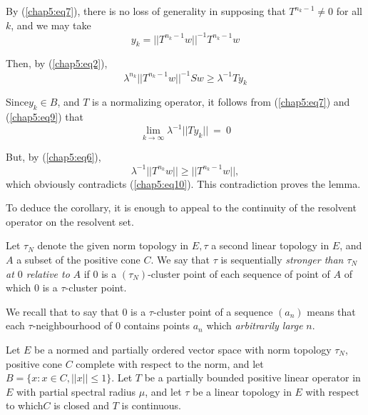 By (\ref{chap5:eq7}), there is no loss of generality in supposing that
$T^{n_k - 1} 
\neq 0$ for all $k$, and we may take 
\begin{equation}
  y_k = || T^{n_k - 1} w || ^{-1} T^{n_k - 1} w \tag{8}\label{chap5:eq8}
\end{equation} 
 
 Then, by (\ref{chap5:eq2}),
 \begin{equation}
   \lambda^{n_k} || T^{n_k - 1} w ||^{-1} S w \geq \lambda^{-1} Ty_k
   \tag{9}\label{chap5:eq9} 
 \end{equation} 
 
 Since\pageoriginale $y_k \in B$, and $T$ is a normalizing operator,
 it follows from (\ref{chap5:eq7}) and (\ref{chap5:eq9}) that  
 \begin{equation}
   \lim_{k \to \infty} \lambda^{-1} ||Ty_k || ~ = ~ 0
   \tag{10}\label{chap5:eq10} 
 \end{equation} 
 
 But, by (\ref{chap5:eq6}), 
 $$
 \lambda^{-1} || T^{n_k} w || \geq || T^{n_k -1} w || ,
 $$
 which obviously contradicts (\ref{chap5:eq10}). This contradiction
 proves the lemma. 
 
 To deduce the corollary, it is enough to appeal to the continuity of
 the resolvent operator on the resolvent set. 
 
\begin{Definition}%
  Let $\tau_N$ denote the given norm topology in $E, \tau$ a second
  linear topology in $E$, and $A$ a subset of the positive cone
  $C$. We say that $\tau$ is sequentially {\em stronger than $\tau_N$
    at $0$ relative to} $A$ if $0$ is a $(\tau_N)$-cluster point of
  each sequence of point of $A$ of which $0$ is a $\tau$-cluster
  point. 
\end{Definition} 
 
We recall that to say that $0$ is a $\tau$-cluster point of a sequence
$(a_n)$ means that each $\tau$-neighbourhood of $0$ contains points
$a_n$ which \textit{arbitrarily large} $n$. 
 
\begin{thmm}\label{chap5:thm5.1} %
  Let $E$ be a normed and partially ordered vector space with norm
  topology $\tau_N$, positive cone $C$ complete with respect to the
  norm, and let $B = \{ x : x \in C, || x || \leq 1 \}$. Let $T$ be a
  partially bounded positive linear operator in $E$ with partial
  spectral radius $\mu$, and let $\tau$ be a linear topology in $E$
  with respect to which\pageoriginale $C$ is closed and $T$ is
  continuous.  
\end{thmm} 
 
